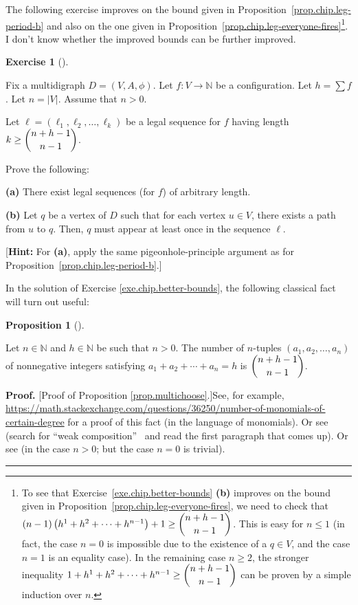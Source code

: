 \documentclass[numbers=enddot,12pt,final,onecolumn,notitlepage]{scrartcl}%
\newcounter{exer}
\theoremstyle{definition}
\newtheorem{prop}[theo]{Proposition}
\newenvironment{proposition}[1][]
{\begin{prop}[#1]\begin{leftbar}}
{\end{leftbar}\end{prop}}
\newtheorem{exmp}[exer]{Exercise}
\newenvironment{exercise}[1][]
{\begin{exmp}[#1]\begin{leftbar}}
{\end{leftbar}\end{exmp}}
\newenvironment{proof}[1][Proof]{\noindent\textbf{#1.} }{\ \rule{0.5em}{0.5em}}
\let\sumnonlimits\sum
\renewcommand{\sum}{\sumnonlimits\limits}
\newcommand{\NN}{\mathbb{N}}
\newcommand{\abs}[1]{\left| #1 \right|}
\newcommand{\tup}[1]{\left( #1 \right)}
\begin{document}
The following exercise improves on the bound given in
Proposition~\ref{prop.chip.leg-period-b} and
also on the one given in
Proposition~\ref{prop.chip.leg-everyone-fires}\footnote{To
  see that Exercise~\ref{exe.chip.better-bounds} \textbf{(b)}
  improves on the bound given in
  Proposition~\ref{prop.chip.leg-everyone-fires},
  we need to check that
  $\tup{n-1} \tup{ h^1 + h^2 + \cdots + h^{n-1} } + 1
  \geq \dbinom{n+h-1}{n-1}$.
  This is easy for $n \leq 1$ (in fact, the case
  $n = 0$ is impossible due to the existence of a
  $q \in V$, and the case $n = 1$ is an equality
  case).
  In the remaining case $n \geq 2$,
  the stronger inequality
  $1 + h^1 + h^2 + \cdots + h^{n-1}
  \geq \dbinom{n+h-1}{n-1}$
  can be proven by a simple induction
  over $n$.}.
I don't know whether the improved bounds can be further
improved.

\begin{exercise} \label{exe.chip.better-bounds}
Fix a multidigraph $D = \tup{V, A, \phi}$.
Let $f : V \to \NN$ be a configuration.
Let $h = \sum f$.
Let $n = \abs{V}$.
Assume that $n > 0$.

Let $\ell = \tup{\ell_1, \ell_2, \ldots, \ell_k}$ be a
legal sequence for $f$ having length
$k \geq \dbinom{n+h-1}{n-1}$.

Prove the following:

\textbf{(a)} There exist legal sequences (for $f$) of
arbitrary length.

\textbf{(b)} Let $q$ be a vertex of $D$ such that for each vertex
$u \in V$, there exists a path from $u$ to $q$.
Then, $q$ must appear at least once in the sequence $\ell$.

[\textbf{Hint:}
For \textbf{(a)}, apply the same pigeonhole-principle argument
as for Proposition~\ref{prop.chip.leg-period-b}.]
\end{exercise}

In the solution of Exercise \ref{exe.chip.better-bounds}, the following
classical fact will turn out useful:

\begin{proposition}
\label{prop.multichoose}Let $n\in\mathbb{N}$ and $h\in\mathbb{N}$ be such that
$n>0$. The number of $n$-tuples $\left(  a_{1},a_{2},\ldots,a_{n}\right)  $ of
nonnegative integers satisfying $a_{1}+a_{2}+\cdots+a_{n}=h$ is $\dbinom
{n+h-1}{n-1}$.
\end{proposition}

\begin{proof}
[Proof of Proposition \ref{prop.multichoose}.]See, for example,
\url{https://math.stackexchange.com/questions/36250/number-of-monomials-of-certain-degree}
for a proof of this fact (in the language of monomials). Or see \cite[\S 1.2]%
{Stanle11} (search for \textquotedblleft weak composition\textquotedblright%
\ and read the first paragraph that comes up).
Or see \cite[Proposition 13.3]{Galvin} (in the case $n > 0$; but the case
$n = 0$ is trivial).
\end{proof}
\end{document}
